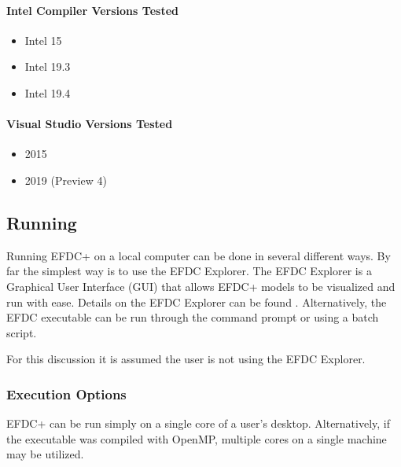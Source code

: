 \documentclass[letterpaper,10pt,english]{sphinxmanual}
\begin{document}
\paragraph{Intel Compiler Versions Tested}
\label{\detokenize{started/build:intel-compiler-versions-tested}}\begin{itemize}
\item {} 
Intel 15

\item {} 
Intel 19.3

\item {} 
Intel 19.4

\end{itemize}


\paragraph{Visual Studio Versions Tested}
\label{\detokenize{started/build:visual-studio-versions-tested}}\begin{itemize}
\item {} 
2015

\item {} 
2019 (Preview 4)

\end{itemize}


\subsection{Running}
\label{\detokenize{started/running:running}}\label{\detokenize{started/running:id1}}\label{\detokenize{started/running::doc}}
Running EFDC+ on a local computer can be done in several different ways.  By far the simplest way is to use the EFDC Explorer.  The EFDC Explorer is a Graphical User Interface (GUI) that allows EFDC+ models to be visualized and run with ease. Details on the EFDC Explorer can be found .   Alternatively, the EFDC executable can be run through the command prompt or using a batch script.

For this discussion it is assumed the user is not using the EFDC Explorer.


\subsubsection{Execution Options}
\label{\detokenize{started/running:execution-options}}
EFDC+ can be run simply on a single core of a user’s desktop.  Alternatively, if the executable was compiled with OpenMP, multiple cores on a single machine may be utilized.
\end{document}
